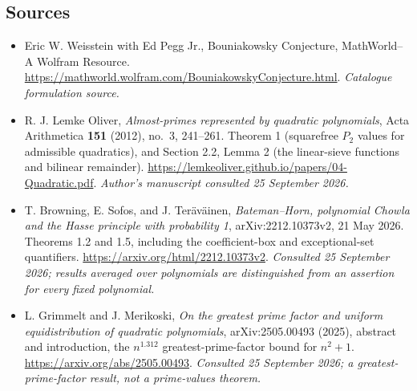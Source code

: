 \documentclass[11pt]{article}
\begin{document}
\subsection{Sources}
\begin{itemize}\raggedright
\item[\textnormal{[S1]}]\hypertarget{source:statement:1}{} Eric W. Weisstein with Ed Pegg Jr., Bouniakowsky Conjecture, MathWorld--A Wolfram Resource.
\url{https://mathworld.wolfram.com/BouniakowskyConjecture.html}.
{\small\textit{Catalogue formulation source.}}
\item[\textnormal{[E1]}]\hypertarget{extra:statement:1}{}
R. J. Lemke Oliver, \emph{Almost-primes represented by quadratic polynomials},
Acta Arithmetica \textbf{151} (2012), no.~3, 241--261.
Theorem 1 (squarefree $P_2$ values for admissible quadratics), and Section 2.2,
Lemma 2 (the linear-sieve functions and bilinear remainder).
\url{https://lemkeoliver.github.io/papers/04-Quadratic.pdf}.
{\small\textit{Author's manuscript consulted 25 September 2026.}}
\item[\textnormal{[E2]}]\hypertarget{extra:statement:2}{}
T. Browning, E. Sofos, and J. Ter\"av\"ainen,
\emph{Bateman--Horn, polynomial Chowla and the Hasse principle with
probability 1}, arXiv:2212.10373v2, 21 May 2026.
Theorems 1.2 and 1.5, including the coefficient-box and exceptional-set
quantifiers. \url{https://arxiv.org/html/2212.10373v2}.
{\small\textit{Consulted 25 September 2026; results averaged over
polynomials are distinguished from an assertion for every fixed polynomial.}}
\item[\textnormal{[E3]}]\hypertarget{extra:statement:3}{}
L. Grimmelt and J. Merikoski,
\emph{On the greatest prime factor and uniform equidistribution of quadratic
polynomials}, arXiv:2505.00493 (2025), abstract and introduction,
the $n^{1.312}$ greatest-prime-factor bound for $n^2+1$.
\url{https://arxiv.org/abs/2505.00493}.
{\small\textit{Consulted 25 September 2026; a greatest-prime-factor result,
not a prime-values theorem.}}
\end{itemize}
\end{document}
